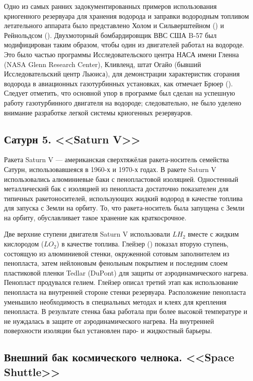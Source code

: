 Одно из самых ранних задокументированных примеров использования криогенного резервуара для хранения водорода и заправки водородным топливом летательного аппарата было представлено Холом и Сильверштейном (\cite{hallsilverstein1955}) и Рейнольдсом (\cite{reynolds1955}). Двухмоторный бомбардировщик ВВС США B-57 был модифицирован таким образом, чтобы один из двигателей работал на водороде. Это было частью программы Исследовательского центра НАСА имени Гленна (NASA Glenn Research Center), Кливленд, штат Огайо (бывший Исследовательский центр Льюиса), для демонстрации характеристик сгорания водорода в авиационных газотурбинных установках, как отмечает Брюер (\cite{brewer1991}). Следует отметить, что основной упор в программе был сделан на успешную работу газотурбинного двигателя на водороде; следовательно, не было уделено внимание разработке легкой системы криогенных резервуаров.


\subsection{Сатурн 5. <<Saturn V>>}\label{ch:overview:1:sec3:sub2}

Ракета Saturn V --- американская сверхтяжёлая ракета-носитель семейства Сатурн, использовавшеяся в 1960-х и 1970-х годах. В ракете Saturn V использовались алюминиевые баки с пенопластовой изоляцией. Одностенный металлический бак с изоляцией из пенопласта достаточно показателен для типичных ракетоносителей, использующих жидкий водород в качестве топлива для запуска с Земли на орбиту. То, что ракета-носитель была запущена с Земли на орбиту, обуславливает такое хранение как краткосрочное.

Две верхние ступени двигателя Saturn V использовали \(LH_2\) вместе с жидким кислородом (\(LO_2\)) в качестве топлива. Глейзер (\cite{glaser1967}) показал вторую ступень, состоящую из алюминиевой стенки, окруженной сотовым заполнителем из пенопласта, затем нейлоновым фенольным покрытием и последним слоем пластиковой пленки Tedlar (DuPont) для защиты от аэродинамического нагрева. Пенопласт продувался гелием. Глейзер описал третий этап как использование пенопласта на внутренней стороне стенки резервуара. Расположение пенопласта уменьшило необходимость в специальных методах и клеях для крепления пенопласта. В результате стенка бака работала при более высокой температуре и не нуждалась в защите от аэродинамического нагрева. На внутренней поверхности изоляции был установлен паро- и жидкостный барьеры.

\subsection{Внешний бак космического челнока. <<Space Shuttle>>}\label{ch:overview:1:sec3:sub3}

